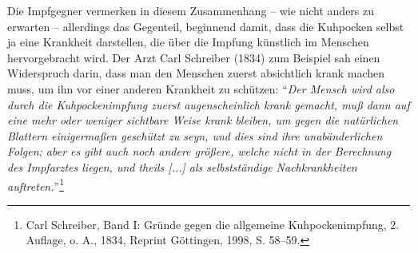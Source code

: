 \documentclass[
    a4paper,
    12pt,
    hyphens,
    chapterprefix=true,
    headheight=33pt,
    footheight=29pt,
    headings=optiontohead,
]{scrartcl}
\begin{document}
{Die Impfgegner vermerken in diesem Zusammenhang -- wie nicht anders zu erwarten -- allerdings das Gegenteil, beginnend damit, dass die Kuhpocken selbst ja eine Krankheit darstellen, die über die Impfung künstlich im Menschen hervorgebracht wird. Der Arzt Carl Schreiber (1834) zum Beispiel sah  einen Widerspruch darin, dass man den Menschen zuerst absichtlich krank machen muss, um ihn vor einer anderen Krankheit zu schützen: "`\textit{Der Mensch wird also durch die Kuhpockenimpfung zuerst augenscheinlich krank gemacht, muß dann auf eine mehr oder weniger sichtbare Weise krank bleiben, um gegen die natürlichen Blattern einigermaßen geschützt zu seyn, und dies sind ihre unabänderlichen Folgen; aber es gibt auch noch andere größere, welche nicht in der Berechnung des Impfarztes liegen, und theils [...] als selbstständige Nachkrankheiten auftreten.}"'\footnote{Carl Schreiber, Band I: Gründe gegen die allgemeine Kuhpockenimpfung, 2. Auflage, o. A., 1834, Reprint Göttingen, 1998, S. 58--59.}\\
}
\end{document}
